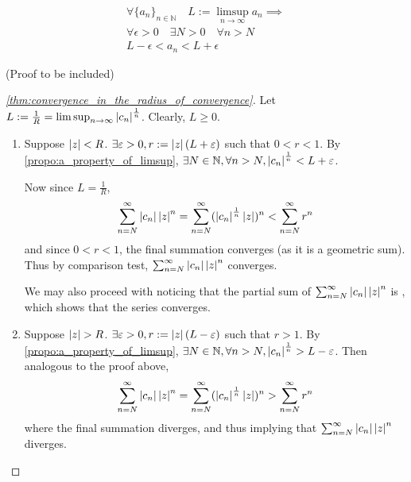 \documentclass[notoc,notitlepage]{tufte-book}
\begin{document}
\begin{propo}\label{propo:a_property_of_limsup}\begin{gather*}
		\forall \{a_n\}_{n \in \mathbb{N}} \quad L := \limsup_{n \to \infty} a_n \implies \\
		\forall \epsilon > 0 \quad \exists N > 0 \quad \forall n > N \\
		L - \epsilon < a_n < L + \epsilon
	\end{gather*}
\end{propo}

(Proof to be included)

\begin{proof}[\cref{thm:convergence_in_the_radius_of_convergence}]
	Let $L := \frac{1}{R} = \limsup_{n \to \infty} \left|c_n\right|^\frac{1}{n}$. Clearly, $L \geq 0$.
	\begin{enumerate}
		\item Suppose $\left|z\right| < R$. $\exists \varepsilon > 0, r := \left|z\right|(L + \varepsilon)$ such that $0 < r < 1$. By \cref{propo:a_property_of_limsup}, $\exists N \in \mathbb{N}, \forall n > N, \left|c_n\right|^\frac{1}{n} < L + \varepsilon$.

		Now since $L = \frac{1}{R}$,
		\begin{equation*}
			\sum_{n=N}^{\infty} \left|c_n\right|\left|z\right|^n = \sum_{n=N}^{\infty} (\left|c_n\right|^\frac{1}{n} \left|z\right|)^n < \sum_{n=N}^{\infty} r^n
		\end{equation*}
		and since $0 < r < 1$, the final summation converges (as it is a geometric sum). Thus by comparison test, $\sum_{n=N}^{\infty} \left|c_n\right| \left|z\right|^n$ converges.

		We may also proceed with noticing that the partial sum of $\sum_{n=N}^{\infty} \left|c_n\right|\left|z\right|^n$ is , which shows that the series converges.

		\item Suppose $\left|z\right| > R$. $\exists \varepsilon > 0, r := \left|z\right|(L - \varepsilon)$ such that $r > 1$. By \cref{propo:a_property_of_limsup}, $\exists N \in \mathbb{N}, \forall n > N, \left|c_n\right|^\frac{1}{n} > L - \varepsilon$. Then analogous to the proof above,
		\begin{equation*}
			\sum_{n=N}^{\infty} \left|c_n\right|\left|z\right|^n = \sum_{n=N}^{\infty} (\left|c_n\right|^\frac{1}{n} \left|z\right|)^n > \sum_{n=N}^{\infty} r^n
		\end{equation*}
		where the final summation diverges, and thus implying that $\sum_{n=N}^{\infty} \left|c_n\right|\left|z\right|^n$ diverges.
	\end{enumerate}
\end{proof}
\end{document}
